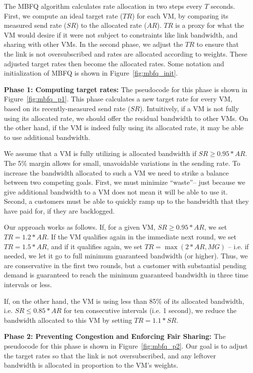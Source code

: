 The MBFQ algorithm calculates rate allocation in two steps every $T$ seconds.
First, we compute an ideal target rate ($TR$) for each VM, by comparing its
measured send rate ($SR$) to the allocated rate ($AR$). $TR$ is a proxy for what
the VM would desire if it were not subject to constraints like link bandwidth,
and sharing with other VMs.  In the second phase, we adjust the $TR$ to ensure
that the link is not oversubscribed and rates are allocated according to
weights. These adjusted target rates then become the allocated rates.  Some
notation and initialization of MBFQ is shown in Figure~\ref{fig:mbfq_init}. 

{\bf Phase 1: Computing target rates:} 
The pseudocode for this phase is shown in Figure~\ref{fig:mbfq_p1}.  This phase
calculates a new target rate for every VM, based on its recently-measured send
rate ($SR$). Intuitively, if a VM is not fully using its allocated rate, we
should offer the residual bandwidth to other VMs.  On the other hand, if the VM
is indeed fully using its allocated rate, it may be able to use additional
bandwidth. 

We assume that a VM is fully utilizing is allocated bandwidth if $SR \geq
0.95*AR$. The 5\% margin allows for small, unavoidable variations in the sending
rate. To increase the bandwidth allocated to such a VM we need to strike a
balance between two competing goals. First, we must minimize ``waste''-- just
because we give additional bandwidth to a VM does not mean it will be able to
use it. Second, a customers must be able to quickly ramp up to the bandwidth
that they have paid for, if they are backlogged.

Our approach works as follows.  If, for a given VM, $SR \geq 0.95*AR$, we set
$TR = 1.2*AR$.  If the VM qualifies again in the immediate next round, we set
$TR = 1.5*AR$, and if it qualifies again, we set $TR = \max(2*AR, MG)$ -- i.e.
if needed, we let it go to full minimum guaranteed bandwidth (or higher).  Thus,
we are conservative in the first two rounds, but a customer with substantial
pending demand is guaranteed to reach the minimum guaranteed bandwidth in three
time intervals or less.

If, on the other hand, the VM is using less than 85\% of its allocated
bandwidth, i.e. $SR \leq 0.85*AR$ for ten consecutive intervals (i.e. 1 second),
we reduce the bandwidth allocated to this VM by setting $TR = 1.1*SR$. 

{\bf Phase 2:  Preventing Congestion and Enforcing Fair Sharing:} The pseudocode
for this phase is shown in Figure~\ref{fig:mbfq_p2}. Our goal is to adjust the
target rates so that the link is not oversubscribed, and any leftover bandwidth
is allocated in proportion to the VM's weights.

